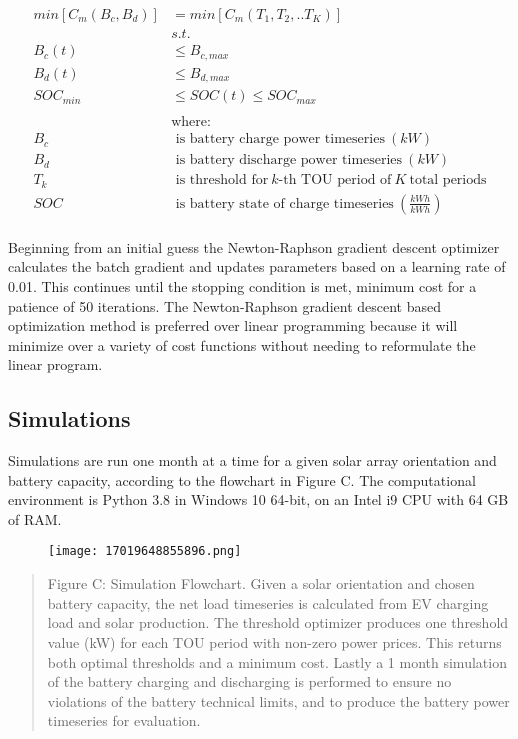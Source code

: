 \documentclass[
]{article}
\begin{document}
\begin{equation}
\begin{split}
min[C_m(B_c,B_d)] & = min[C_m(T_1,T_2,..T_K)] \\
& s.t. \\
B_c(t) & \le B_{c,max} \\
B_d(t) & \le B_{d,max} \\
SOC_{min} & \le SOC(t) \le SOC_{max} \\
\\
& \text{where:} \\
B_c & \text{ is battery charge power timeseries}\ (kW) \\
B_d & \text{ is battery discharge power timeseries}\ (kW) \\
T_k & \text{ is threshold for}\ k\text{-th TOU period of}\ K\ \text{total periods} \\
SOC & \text{ is battery state of charge timeseries}\ (\frac{kWh}{kWh}) \\
\end{split}
\end{equation}

Beginning from an initial guess the Newton-Raphson gradient descent
optimizer calculates the batch gradient and updates parameters based on
a learning rate of 0.01. This continues until the stopping condition is
met, minimum cost for a patience of 50 iterations. The Newton-Raphson
gradient descent based optimization method is preferred over linear
programming because it will minimize over a variety of cost functions
without needing to reformulate the linear program.

\hypertarget{simulations}{%
\subsection{Simulations}\label{simulations}}

Simulations are run one month at a time for a given solar array
orientation and battery capacity, according to the flowchart in Figure
C. The computational environment is Python 3.8 in Windows 10 64-bit, on
an Intel i9 CPU with 64 GB of RAM.

\begin{figure}
\centering
\texttt{[image: 17019648855896.png]}
\caption{}
\end{figure}

\begin{quote}
Figure C: Simulation Flowchart. Given a solar orientation and chosen
battery capacity, the net load timeseries is calculated from EV charging
load and solar production. The threshold optimizer produces one
threshold value (kW) for each TOU period with non-zero power prices.
This returns both optimal thresholds and a minimum cost. Lastly a 1
month simulation of the battery charging and discharging is performed to
ensure no violations of the battery technical limits, and to produce the
battery power timeseries for evaluation.
\end{quote}
\end{document}
